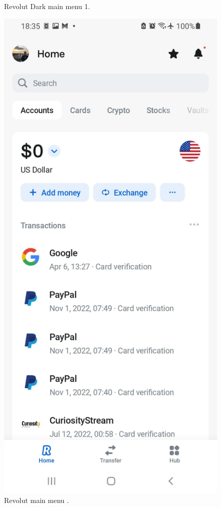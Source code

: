 \begin{figure}[htbp]
\begin{minipage}[b]{0.27\textwidth}
    \caption{Revolut Dark main menu 1.}
    \label{fig:image1}
  \end{minipage}
  \hfill
  \begin{minipage}[b]{0.27\textwidth}
    \includegraphics[width=\textwidth]{Screen Shots/Revolut/W_Revolut.jpg}
    \caption{Revolut main menu .}
    \label{fig:image2}
  \end{minipage}
\end{figure}
